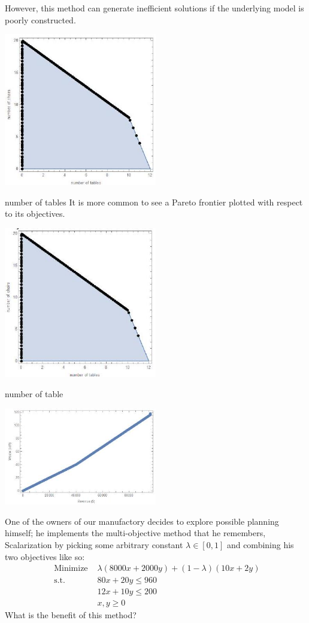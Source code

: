 However, this method can generate inefficient solutions if the underlying model is poorly constructed.

\includegraphics[width=0.5\textwidth]{optimization/multi-objective/images/2022_02_28_634e8079070800ac7e3cg-14}

number of tables It is more common to see a Pareto frontier plotted with respect to its objectives.

\includegraphics[width=0.5\textwidth]{optimization/multi-objective/images/2022_02_28_634e8079070800ac7e3cg-15}

number of table

\includegraphics[width=0.5\textwidth]{optimization/multi-objective/images/2022_02_28_634e8079070800ac7e3cg-15(1)}

One of the owners of our manufactory decides to explore possible planning himself; he implements the multi-objective method that he remembers, Scalarization by picking some arbitrary constant $\lambda \in[0,1]$ and combining his two objectives like so:
$$
\begin{array}{cl}
\text { Minimize } & \lambda(8000 x+2000 y)+(1-\lambda)(10 x+2 y) \\
\text { s.t. } & 80 x+20 y \leq 960 \\
& 12 x+10 y \leq 200 \\
& x, y \geq 0
\end{array}
$$
What is the benefit of this method?


